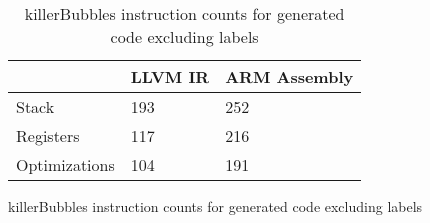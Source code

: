 \begin{table}[h!]
\centering
\begin{tabular}{p{}p{}p{}}
  \hline
 & LLVM IR & ARM Assembly \\ 
  \hline
Stack & 193 & 252 \\ 
  Registers & 117 & 216 \\ 
  Optimizations & 104 & 191 \\ 
   \hline
\end{tabular}
\caption{killerBubbles instruction counts for generated code excluding labels}
\caption{killerBubbles instruction counts for generated code excluding labels}
\end{table}
